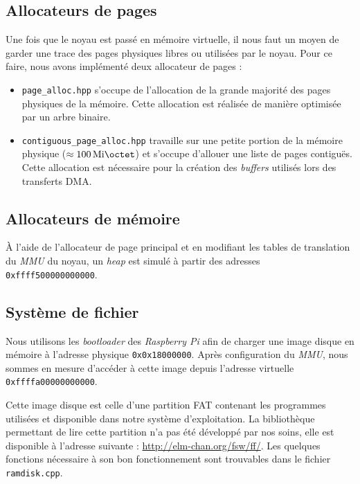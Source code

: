 \documentclass[french, 12pt]{article}
\newcommand{\rpi}{\emph{Raspberry Pi}}
\begin{document}

\subsection{Allocateurs de pages}
Une fois que le noyau est passé en mémoire virtuelle, il nous faut un moyen
de garder une trace des pages physiques libres ou utilisées par le noyau. Pour
ce faire, nous avons implémenté deux allocateur de pages :
\begin{itemize}
    \item \texttt{page\_alloc.hpp} s'occupe de l'allocation de la grande
          majorité des pages physiques de la mémoire. Cette allocation est
          réalisée de manière optimisée par un arbre binaire.

    \item \texttt{contiguous\_page\_alloc.hpp} travaille sur une petite portion
          de la mémoire physique ($\approx \SI{100}{\mebi\octet}$) et s'occupe
          d'allouer une liste de pages contiguës. Cette allocation est
          nécessaire pour la création des \textit{buffers} utilisés lors des
          transferts DMA.
\end{itemize}

\subsection{Allocateurs de mémoire}
À l'aide de l'allocateur de page principal et en modifiant les tables de
translation du \textit{MMU} du noyau, un \textit{heap} est simulé à partir des
adresses \texttt{0xffff500000000000}.


\subsection{Système de fichier}
Nous utilisons les \textit{bootloader} des \rpi{} afin de charger une
image disque en mémoire à l'adresse physique \texttt{0x0x18000000}. Après
configuration du \textit{MMU}, nous sommes en mesure d'accéder à cette image
depuis l'adresse virtuelle \texttt{0xffffa00000000000}.

Cette image disque est celle d'une partition FAT contenant les programmes
utilisées et disponible dans notre système d'exploitation. La bibliothèque
permettant de lire cette partition n'a pas été développé par nos soins, elle est
disponible à l'adresse suivante : \url{http://elm-chan.org/fsw/ff/}. Les
quelques fonctions nécessaire à son bon fonctionnement sont trouvables dans le
fichier \texttt{ramdisk.cpp}.
\end{document}
